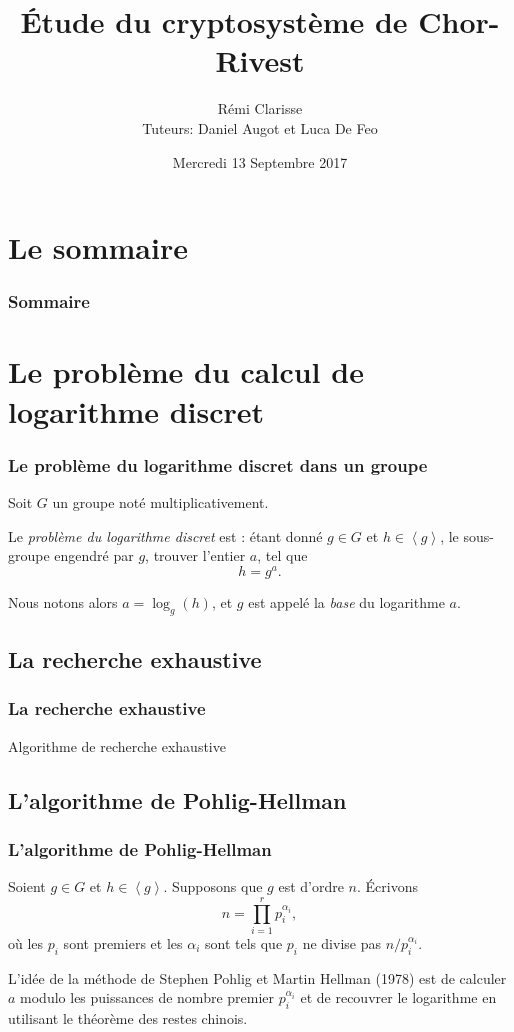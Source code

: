 \documentclass{beamer}
\title{Étude du cryptosystème de Chor-Rivest}
\author{Rémi {Clarisse} \\ Tuteurs: Daniel {Augot} et Luca {De Feo}}
\institute{ INRIA Saclay--Île-de-France \\ Université de Bordeaux}
\date{Mercredi 13 Septembre 2017}
\theoremstyle{definition}
\theoremstyle{remark}
\def\gen #1{\left\langle#1\right\rangle}
\begin{document}
\begin{frame}[plain]
	\titlepage
\end{frame}

\section*{Le sommaire}
\begin{frame}
	\frametitle{Sommaire}
  	\tableofcontents[hidesubsections]
\end{frame}

\section{Le problème du calcul de logarithme discret}
\begin{frame}
	\frametitle{Le problème du logarithme discret dans un groupe}
        Soit $G$ un groupe noté multiplicativement.

        Le \textit{problème du logarithme discret} est : étant donné $g\in G$ et $h \in \gen{g}$, le sous-groupe engendré par $g$, trouver l'entier $a$, tel que $$h=g^a.$$

        Nous notons alors $a=\log_g(h)$, et $g$ est appelé la \textit{base} du logarithme $a$.
\end{frame}

\subsection{La recherche exhaustive}
\begin{frame}
  \frametitle{La recherche exhaustive}
        \begin{algorithm}[H]
          \caption{Algorithme de recherche exhaustive}
          \label{algo:logDiscretNaif}
          \begin{algorithmic}[1]
            \REQUIRE{$g$ d'ordre $n$ et $h \in \gen{g}$}
            \ENDWHILE
          \end{algorithmic}
        \end{algorithm}
\end{frame}

\subsection{L'algorithme de Pohlig-Hellman}
\begin{frame}
	\frametitle{L'algorithme de Pohlig-Hellman}
        Soient $g\in G$ et $h \in \gen{g}$. Supposons que $g$ est d'ordre $n$. \'Ecrivons $$n = \prod_{i=1}^r p_i^{\alpha_i},$$ où les $p_i$ sont premiers et les $\alpha_i$ sont tels que $p_i$ ne divise pas $n/p_i^{\alpha_i}$.

        L'idée de la méthode de Stephen Pohlig et Martin Hellman (1978) est de calculer $a$ modulo les puissances de nombre premier $p_i^{\alpha_i}$ et de recouvrer le logarithme en utilisant le théorème des restes chinois.
\end{frame}
\end{document}
